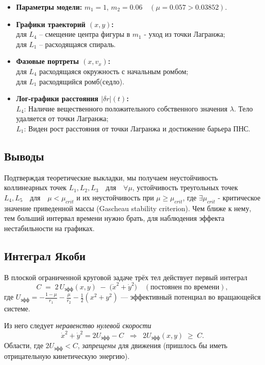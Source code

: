 \documentclass[12pt]{article}
\begin{document}
\begin{itemize}
  \item \textbf{Параметры модели:} $m_1=1$, $m_2=0.06\quad(\mu=0.057>0.03852)$.
  \item \textbf{Графики траекторий $(x,y)$:}\\
        для $L_4$ -- смещение центра фигуры в $m_1$ - уход из точки Лагранжа;\\
        для $L_1$ -- расходящаяся спираль. 
  \item \textbf{Фазовые портреты $(x,v_x)$:}\\
        для $L_4$ расходящаяся окружность с начальным ромбом;\\
        для $L_1$ расходящийся ромб(седло).
  \item \textbf{Лог‑графики расстояния $|\delta r|(t)$:}\\
        $L_4$:  Наличие вещественного положительного собственного значения $\lambda$. Тело удаляется от точки Лагранжа;\\
        $L_1$: Виден рост расстояния от точки Лагранжа и достижение барьера ПНС.
\end{itemize}

\subsection{Выводы}

Подтверждая теоретические выкладки, мы получаем неустойчивость коллинеарных точек $L_1, L_2, L_3  \quad \text{для} \quad \forall\mu$, устойчивость треугольных точек $L_4,L_5  \quad \text{для} \quad  \mu < \mu_{crit}$ и их неустойчивость при $\mu \geqslant \mu_{crit}$, где $\exists\mu_{crit}$ - критическое значение приведенной массы (Gascheau stability criterion). Чем ближе к нему, тем больший интервал времени нужно брать, для наблюдения эффекта нестабильности на графиках.

\subsection{Интеграл Якоби}

В плоской ограниченной круговой задаче трёх тел действует первый интеграл
\[
C \;=\; 2\,U_{\mathrm{эфф}}(x,y)\;-\;\bigl(\dot x^{2}+\dot y^{2}\bigr)
\quad(\text{постоянен по времени}),
\]
где
\(
U_{\mathrm{эфф}} = -\frac{1-\mu}{r_1}-\frac{\mu}{r_2}-\tfrac12(x^{2}+y^{2})
\)
— эффективный потенциал во вращающейся системе.

Из него следует \emph{неравенство нулевой скорости}
\[
\dot x^{2}+\dot y^{2}=2U_{\mathrm{эфф}}-C \;\;\Longrightarrow\;\;
2U_{\mathrm{эфф}}(x,y)\;\ge\;C .
\]
Области, где $2U_{\mathrm{эфф}}<C$, \emph{запрещены} для движения
(пришлось бы иметь отрицательную кинетическую энергию).
\end{document}
